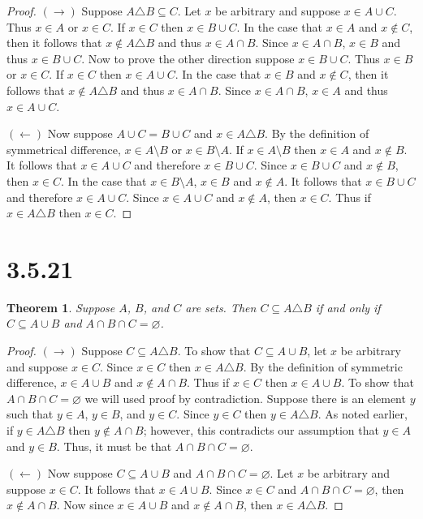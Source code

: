 \documentclass{article}
\newtheorem*{theorem}{Theorem}  %
\begin{document}
\begin{proof}
$(\rightarrow)$ Suppose $A \triangle B \subseteq C$. Let $x$ be arbitrary and suppose $x \in A \cup C$. Thus $x \in A$ or $x \in C$.  If $x \in C$ then $x \in B \cup C$. In the case that $x \in A$ and $x \notin C$, then it follows that $x \notin A \triangle B$ and thus $x \in A \cap B$. Since $x \in A \cap B$, $x \in B$ and thus $x \in B \cup C$. Now to prove the other direction suppose $x \in B \cup C$. Thus $x \in B$ or $x \in C$. If $x \in C$ then $x \in A \cup C$. In the case that $x \in B$ and $x \notin C$, then it follows that $x \notin A \triangle B$ and thus $x \in A \cap B$. Since $x \in A \cap B$, $x \in A$ and thus $x \in A \cup C$.

$(\leftarrow)$ Now suppose $A \cup C = B \cup C$ and $x \in A \triangle B$. By the definition of symmetrical difference, $x \in A \setminus B$ or $x \in B \setminus A$. If $x \in A \setminus B$ then $x \in A$ and $x \notin B$. It follows that $x \in A \cup C$ and therefore $x \in B \cup C$. Since $x \in B \cup C$ and $x \notin B$, then $x \in C$. In the case that $x \in B \setminus A$, $x \in B$ and $x \notin A$. It follows that $x \in B \cup C$ and therefore $x \in A \cup C$. Since $x \in A \cup C$ and $x \notin A$, then $x \in C$. Thus if $x \in A \triangle B$ then $x \in C$.
\end{proof}

\section*{3.5.21}
\begin{theorem} Suppose $A$, $B$, and $C$ are sets. Then $C \subseteq A \triangle B$ if and only if $C \subseteq A \cup B$ and $A \cap B \cap C = \varnothing$.
\end{theorem}

\begin{proof}
$(\rightarrow)$ Suppose $C \subseteq A \triangle B$. To show that $C \subseteq A \cup B$, let $x$ be arbitrary and suppose $x \in C$. Since $x \in C$ then $x \in A \triangle B$. By the definition of symmetric difference, $x \in A \cup B$ and $x \notin A \cap B$. Thus if $x \in C$ then $x \in A \cup B$. To show that $A \cap B \cap C = \varnothing$ we will used proof by contradiction. Suppose there is an element $y$ such that $y \in A$, $y \in B$, and $y \in C$. Since $y \in C$ then $y \in A \triangle B$. As noted earlier, if $y \in A \triangle B$ then $y \notin A \cap B$; however, this contradicts our assumption that $y \in A$ and $y \in B$. Thus, it must be that $A \cap B \cap C = \varnothing$.

$(\leftarrow)$ Now suppose $C \subseteq A \cup B$ and $A \cap B \cap C = \varnothing$. Let $x$ be arbitrary and suppose $x \in C$. It follows that $x \in A \cup B$. Since $x \in C$ and $A \cap B \cap C = \varnothing$, then $x \notin A \cap B$. Now since $x \in A \cup B$ and $x \notin A \cap B$, then $x \in A \triangle B$. 
\end{proof}
\end{document}

